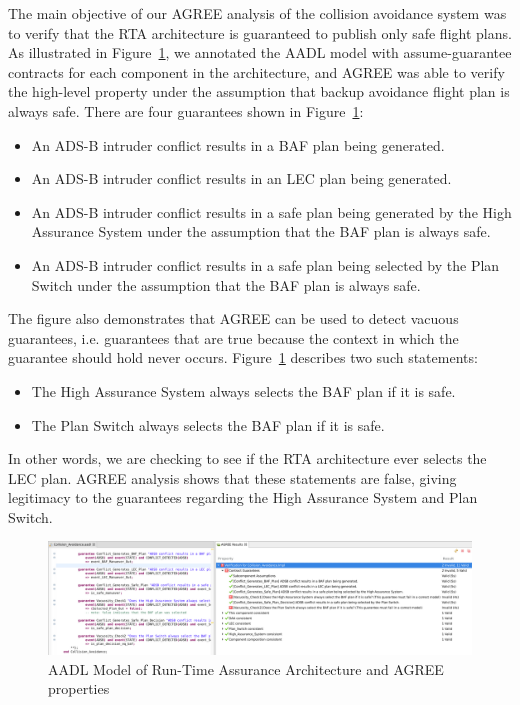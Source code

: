 The main objective of our AGREE analysis of the collision avoidance system was to verify that the RTA architecture is guaranteed to publish only safe flight plans.
%
As illustrated in Figure~\ref{fig:rta-agree}, we annotated the AADL model with assume-guarantee contracts for each component in the architecture, and AGREE was able to verify the high-level property under the assumption that backup avoidance flight plan is always safe.
There are four guarantees shown in Figure~\ref{fig:rta-agree}:
\begin{itemize}
\item An ADS-B intruder conflict results in a BAF plan being generated.
\item An ADS-B intruder conflict results in an LEC plan being generated.
\item An ADS-B intruder conflict results in a safe plan being generated by the High Assurance System under the assumption that the BAF plan is always safe.
\item An ADS-B intruder conflict results in a safe plan being selected by the Plan Switch under the assumption that the BAF plan is always safe.
\end{itemize}

The figure also demonstrates that AGREE can be used to detect vacuous guarantees, i.e. guarantees that are true because the context in which the guarantee should hold never occurs. Figure~\ref{fig:rta-agree} describes two such statements:
\begin{itemize}
\item The High Assurance System always selects the BAF plan if it is safe.
\item The Plan Switch always selects the BAF plan if it is safe.
\end{itemize}
In other words, we are checking to see if the RTA architecture ever selects the LEC plan.  AGREE analysis shows that these statements are false, giving legitimacy to the guarantees regarding the High Assurance System and Plan Switch.

\begin{figure}
	\centering
	\includegraphics[width=\textwidth]{figures/rta-agree-v2.jpg}
	\caption{AADL Model of Run-Time Assurance Architecture and AGREE properties}
	\label{fig:rta-agree}
\end{figure}
